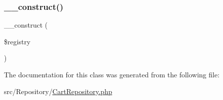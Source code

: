 \subsubsection{\texorpdfstring{\+\_\+\+\_\+construct()}{\_\_construct()}}
{\footnotesize\ttfamily \+\_\+\+\_\+construct (\begin{DoxyParamCaption}\item[{Manager\+Registry}]{\$registry }\end{DoxyParamCaption})}



The documentation for this class was generated from the following file\+:\begin{DoxyCompactItemize}
\item 
src/\+Repository/\mbox{\hyperlink{_cart_repository_8php}{Cart\+Repository.\+php}}\end{DoxyCompactItemize}
